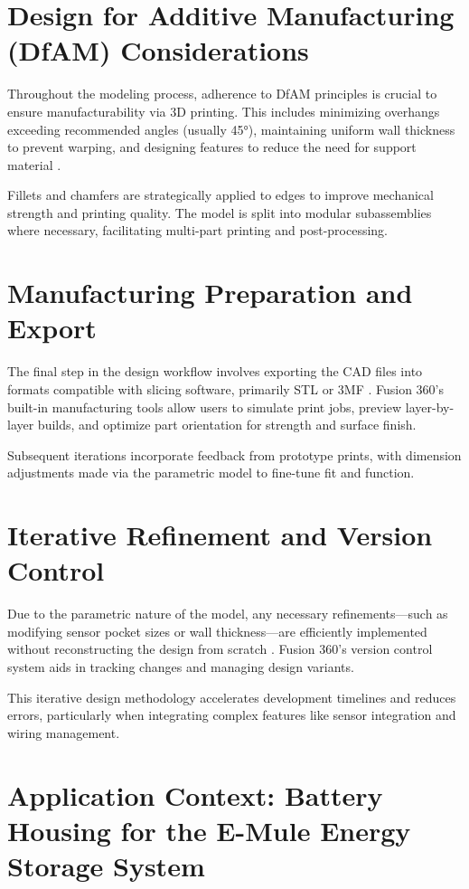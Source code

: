 \section{Design for Additive Manufacturing (DfAM) Considerations}

Throughout the modeling process, adherence to DfAM principles is crucial to ensure manufacturability via 3D printing. This includes minimizing overhangs exceeding recommended angles (usually 45°), maintaining uniform wall thickness to prevent warping, and designing features to reduce the need for support material \cite{anderson2020}.

Fillets and chamfers are strategically applied to edges to improve mechanical strength and printing quality. The model is split into modular subassemblies where necessary, facilitating multi-part printing and post-processing.

\section{Manufacturing Preparation and Export}

The final step in the design workflow involves exporting the CAD files into formats compatible with slicing software, primarily STL or 3MF \cite{gebhardt2016}. Fusion 360’s built-in manufacturing tools allow users to simulate print jobs, preview layer-by-layer builds, and optimize part orientation for strength and surface finish.

Subsequent iterations incorporate feedback from prototype prints, with dimension adjustments made via the parametric model to fine-tune fit and function.

\section{Iterative Refinement and Version Control}

Due to the parametric nature of the model, any necessary refinements—such as modifying sensor pocket sizes or wall thickness—are efficiently implemented without reconstructing the design from scratch \cite{hogan2025}. Fusion 360’s version control system aids in tracking changes and managing design variants.

This iterative design methodology accelerates development timelines and reduces errors, particularly when integrating complex features like sensor integration and wiring management.



\section{Application Context: Battery Housing for the E-Mule Energy Storage System}

